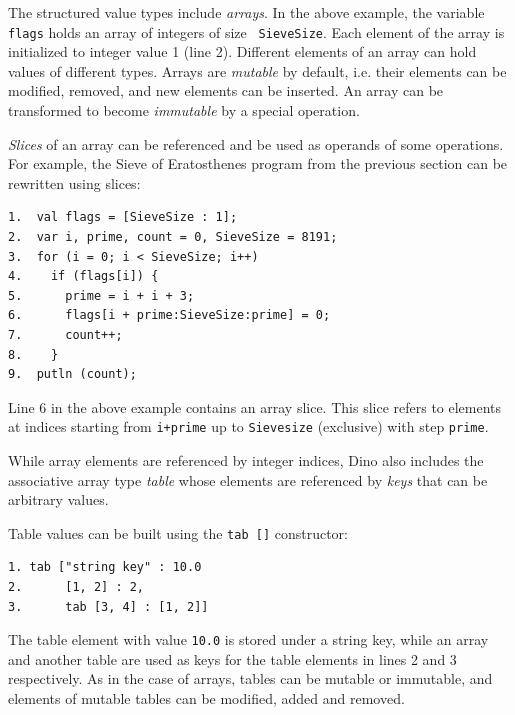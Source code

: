 \documentclass[preprint]{sigplanconf}
\begin{document}
The structured value types include \emph{arrays}.  In the above
example, the variable {\tt flags} holds an array of integers of size {\tt
SieveSize}.  Each element of the array is initialized to integer value 1
(line 2).  Different elements of an array can hold values of different
types.  Arrays are \emph{mutable} by default, i.e. their elements can be
modified, removed, and new elements can be inserted.  An array can be
transformed to become \emph{immutable} by a special operation.

\emph{Slices} of an array can be referenced and be used as operands of some operations.
For example, the Sieve of Eratosthenes program from the previous section can be rewritten using slices:

{\footnotesize
\begin{verbatim}
1.  val flags = [SieveSize : 1];
2.  var i, prime, count = 0, SieveSize = 8191;
3.  for (i = 0; i < SieveSize; i++)
4.    if (flags[i]) {
5.      prime = i + i + 3;
6.      flags[i + prime:SieveSize:prime] = 0;
7.      count++;
8.    }
9.  putln (count);
\end{verbatim}
}

Line 6 in the above example contains an array slice. This slice refers to elements
at indices starting from {\tt i+prime} up to {\tt Sievesize} (exclusive)
with step {\tt prime}.

While array elements are referenced by integer indices,
Dino also includes the associative array type \emph{table}
whose elements are referenced by \emph{keys} that can be arbitrary values. %

Table values can be built using the {\tt tab []} constructor:

{\footnotesize
\begin{verbatim}
1. tab ["string key" : 10.0
2.      [1, 2] : 2,
3.      tab [3, 4] : [1, 2]]
\end{verbatim}
}

The table element with value {\tt 10.0} is stored under a string key,
while an array and another table are used as keys for the table elements in lines 2 and 3 respectively.
As in the case of arrays,
tables can be mutable or immutable, and elements of mutable tables can
be modified, added and removed.
\end{document}
